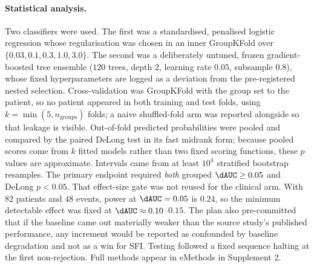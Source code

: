 \paragraph{Statistical analysis.} Two classifiers were used. The first was a
standardised, penalised logistic regression whose regularisation was chosen in
an inner GroupKFold over $\{0.03,0.1,0.3,1.0,3.0\}$. The second was a
deliberately untuned, frozen gradient-boosted tree ensemble ($120$ trees, depth
$2$, learning rate $0.05$, subsample $0.8$), whose fixed hyperparameters are
logged as a deviation from the pre-registered nested selection. Cross-validation
was GroupKFold with the group set to the patient, so no patient appeared
in both training and test folds, using $k=\min(5,n_{\mathrm{groups}})$ folds; a
naive shuffled-fold arm was reported alongside so that leakage is visible.
Out-of-fold predicted probabilities were pooled and
compared by the paired DeLong test in its fast midrank form;
because pooled scores come from $k$ fitted models
rather than two fixed scoring functions, these $p$ values are approximate.
Intervals came from at least $10^{4}$ stratified bootstrap resamples. The primary
endpoint required \emph{both} grouped $\dAUC\geq0.05$ and DeLong $p<0.05$. That
effect-size gate was not reused for the clinical arm. With $82$ patients and $48$
events, power at $\dAUC=0.05$ is $0.24$, so the minimum detectable effect was
fixed at $\dAUC\approx0.10$--$0.15$. The plan also pre-committed that if the
baseline came out materially weaker than the source study's published
performance, any increment would be reported as confounded by baseline
degradation and not as a win for SFI. Testing followed a fixed sequence halting
at the first non-rejection. Full methods appear in eMethods in Supplement 2.
